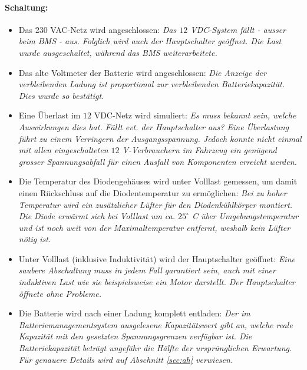 \paragraph{Schaltung:} \begin{itemize}
	\item Das $230$ VAC-Netz wird angeschlossen: \textit{Das $12$ VDC-System fällt - ausser beim BMS - aus. Folglich wird auch der Hauptschalter geöffnet. Die Last wurde ausgeschaltet, während das BMS weiterarbeitete.}
	\item Das alte Voltmeter der Batterie wird angeschlossen: \textit{Die Anzeige der verbleibenden Ladung ist proportional zur verbleibenden Batteriekapazität. Dies wurde so bestätigt.}
	\item Eine Überlast im $12$ VDC-Netz wird simuliert: \textit{Es muss bekannt sein, welche Auswirkungen dies hat. Fällt evt. der Hauptschalter aus? Eine Überlastung führt zu einem Verringern der Ausgangsspannung. Jedoch konnte nicht einmal mit allen eingeschalteten $12$ V-Verbrauchern im Fahrzeug ein genügend grosser Spannungsabfall für einen Ausfall von Komponenten erreicht werden.}
	\item Die Temperatur des Diodengehäuses wird unter Volllast gemessen, um damit einen Rückschluss auf die Diodentemperatur zu ermöglichen: \textit{Bei zu hoher Temperatur wird ein zusätzlicher Lüfter für den Diodenkühlkörper montiert. Die Diode erwärmt sich bei Volllast um ca. $25^\circ$ C über Umgebungstemperatur und ist noch weit von der Maximaltemperatur entfernt, weshalb kein Lüfter nötig ist.}
	\item Unter Volllast (inklusive Induktivität) wird der Hauptschalter geöffnet: \textit{Eine saubere Abschaltung muss in jedem Fall garantiert sein, auch mit einer induktiven Last wie sie beispielsweise ein Motor darstellt. Der Hauptschalter öffnete ohne Probleme.}
	\item Die Batterie wird nach einer Ladung komplett entladen: \textit{Der im Batteriemanagementsystem ausgelesene Kapazitätswert gibt an, welche reale Kapazität mit den gesetzten Spannungsgrenzen verfügbar ist. Die Batteriekapazität beträgt ungefähr die Hälfte der ursprünglichen Erwartung. Für genauere Details wird auf Abschnitt \ref{sec:ah} verwiesen.}
\end{itemize}

